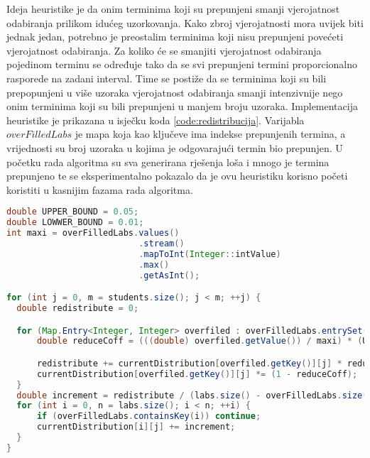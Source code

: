 \documentclass[times, utf8, zavrsni]{fer}
\begin{document}
Ideja heuristike je da onim terminima koji su prepunjeni smanji
vjerojatnost odabiranja prilikom idućeg uzorkovanja. Kako zbroj vjerojatnosti mora uvijek biti jednak jedan, potrebno je
preostalim terminima koji nisu prepunjeni povećeti vjerojatnost odabiranja. Za koliko će se smanjiti vjerojatnost odabiranja
pojedinom terminu se određuje tako da se svi prepunjeni termini proporcionalno rasporede na zadani interval. Time se postiže da se terminima
koji su bili prepopunjeni u više uzoraka vjerojatnost odabiranja smanji intenzivnije nego onim terminima koji su bili prepunjeni
u manjem broju uzoraka. Implementacija heuristike je prikazana u isječku koda \ref{code:redistribucija}. Varijabla
$overFilledLabs$ je mapa koja kao ključeve ima indekse prepunjenih termina, a vrijednosti su broj uzoraka u kojima
je odgovarajući termin bio prepunjen. U početku rada algoritma
su sva generirana rješenja loša i mnogo je termina prepunjeno te se eksperimentalno pokazalo da je ovu heuristiku korisno početi koristiti u
kasnijim fazama rada algoritma.

\begin{lstlisting}[caption={Redistribucija vjerojatnosti prepunjenih termina},label=code:redistribucija, language=Java]
double UPPER_BOUND = 0.05;
double LOWWER_BOUND = 0.01;
int maxi = overFilledLabs.values()
                          .stream()
                          .mapToInt(Integer::intValue)
                          .max()
                          .getAsInt();

for (int j = 0, m = students.size(); j < m; ++j) {
  double redistribute = 0;

  for (Map.Entry<Integer, Integer> overfiled : overFilledLabs.entrySet()) {
      double reduceCoff = (((double) overfiled.getValue()) / maxi) * (UPPER_BOUND - LOWWER_BOUND) + LOWWER_BOUND;

      redistribute += currentDistribution[overfiled.getKey()][j] * reduceCoff;
      currentDistribution[overfiled.getKey()][j] *= (1 - reduceCoff);
  }
  double increment = redistribute / (labs.size() - overFilledLabs.size());
  for (int i = 0, n = labs.size(); i < n; ++i) {
      if (overFilledLabs.containsKey(i)) continue;
      currentDistribution[i][j] += increment;
  }
}
\end{lstlisting}
\end{document}
